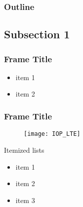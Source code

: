 \begin{frame}
  \frametitle{Outline}
  \tableofcontents[currentsection, subsectionstyle=hide]
\end{frame}




\subsection{ Subsection 1 }




\begin{frame}
  \frametitle{ Frame Title }

\begin{itemize}
\item item 1
\item item 2
\end{itemize}

\end{frame}



\begin{frame}
  \frametitle{ Frame Title }
  \begin{figure}
    \centering
    \texttt{[image: IOP\_LTE]}
  \end{figure}
\end{frame}









\begin{frame}

Itemized lists
  \begin{itemize}
    
  \item item 1
    \vskip20pt

  \item item 2
    \vskip20pt
 
  \item item 3

  \end{itemize}

\end{frame}



